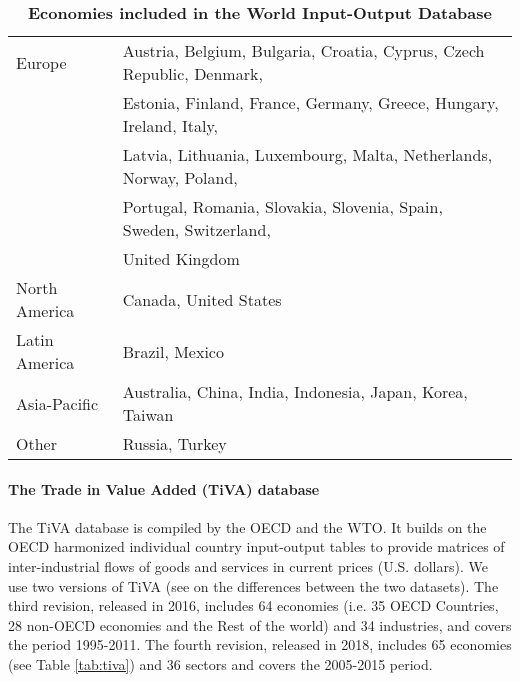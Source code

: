 \documentclass[11pt,a4paper]{article}
\begin{document}
\begin{table}[!h]
\begin{threeparttable}
\centering
\centering
\caption{\small{\textbf{Economies included in the World Input-Output Database}}}
\small
\begin{tabular}{ll}
\hline\hline
Europe & Austria, Belgium, Bulgaria, Croatia, Cyprus, Czech Republic, Denmark,\\
& Estonia, Finland, France, Germany, Greece, Hungary, Ireland, Italy,\\
& Latvia, Lithuania, Luxembourg, Malta, Netherlands, Norway, Poland,\\
&Portugal, Romania, Slovakia, Slovenia, Spain, Sweden, Switzerland,\\
& United Kingdom\\
North  America& Canada, United States\\
Latin America & Brazil, Mexico \\
Asia-Pacific & Australia, China, India, Indonesia, Japan, Korea, Taiwan\\
Other & Russia, Turkey\\
\hline\hline
\end{tabular} 
\label{tab:wiod}
\end{threeparttable}
\end{table} 
\paragraph{The Trade in Value Added (TiVA) database}
The TiVA database is compiled by the OECD and the WTO. It builds on the OECD harmonized individual country input-output tables to provide matrices of inter-industrial flows of goods and services in current prices (U.S. dollars).
We use two versions of TiVA (see \cite{OECD2018} on the differences between the two datasets).
The third revision, released in 2016, includes 64 economies (i.e. 35 OECD Countries, 28 non-OECD economies and the Rest of the world) and 34 industries, and covers the period 1995-2011.
The fourth revision, released in 2018, includes 65 economies (see Table \ref{tab:tiva}) and 36 sectors and covers the 2005-2015 period.
\end{document}
